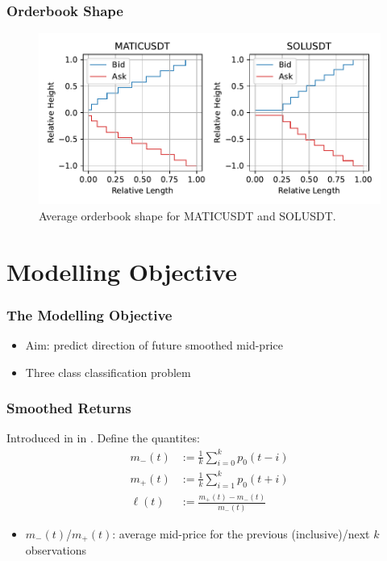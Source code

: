 \documentclass[handout]{beamer}
\begin{document}
\begin{frame}
    \frametitle{Orderbook Shape}
    \begin{figure}[ht]
        \centering
        \includegraphics[width=1.0\textwidth]{./images/shapes_2.pdf}
        \caption{Average orderbook shape for MATICUSDT and SOLUSDT.}
        \label{shape2}
    \end{figure}
\end{frame}

\section{Modelling Objective}
\begin{frame}
    \frametitle{The Modelling Objective}
     \begin{itemize}
        \item Aim: predict direction of future smoothed mid-price
        \item Three class classification problem
    \end{itemize}
    
\end{frame}

\begin{frame}
    \frametitle{Smoothed Returns}
    Introduced in in {\color{blue}\cite{AVRAAM2017}}. Define the quantites:
        \begin{align}
            m_{-}(t) &:= \frac{1}{k} \sum_{i=0}^{k} p_0(t-i) \\
            m_{+}(t) &:= \frac{1}{k} \sum_{i=1}^{k} p_0(t+i) \\
            \ell(t) &:= \frac{m_{+}(t) - m_{-}(t)}{m_{-}(t)}
            \label{smoothed_returns}
        \end{align}
         \begin{itemize}
    \item $m_{-}(t)$/$m_{+}(t)$: average mid-price for the previous (inclusive)/next $k$ observations
\end{itemize}
\end{frame}
\end{document}
